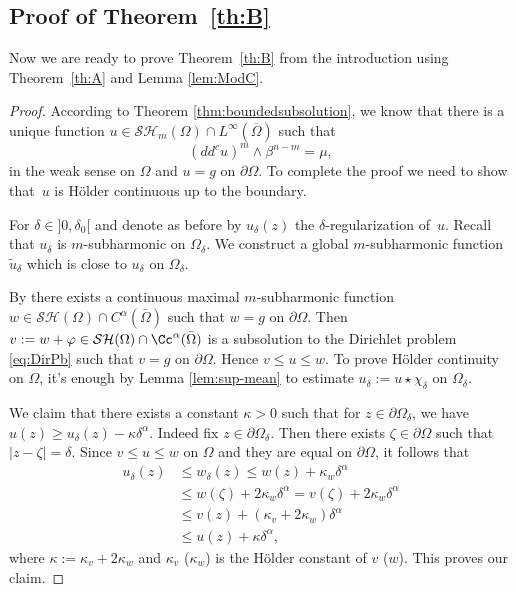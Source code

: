 \subsection{Proof of Theorem~\ref{th:B}}

Now we are ready to prove Theorem~\ref{th:B} from the introduction using Theorem~\ref{th:A} and Lemma \ref{lem:ModC}.

\begin{proof} According to Theorem \ref{thm:boundedsubsolution}, we know that there is a unique function $u\in \mathcal{SH}_m(\Omega)\cap L^{\infty}(\overline{\Omega}) $ such that
\[
(dd^c u)^m\wedge\beta^{n-m}=\mu,
\]
in the weak sense on $\Omega$ and $ u=g $ on $\partial\Omega$. To complete the proof we need to show that~$u$ is Hölder continuous up to the boundary.

For $\delta\in{}]0,\delta_0[$ and denote as before by $u_{\delta}(z)$ the $\delta$-regularization of~$u$. Recall that ${u}_{\delta}$ is $m$-subharmonic on $\Omega_\delta$. We construct a global $m$-subharmonic function $\tilde{u}_{\delta}$ which is close to ${u}_{\delta}$ on $\Omega_\delta$.

By \cite{Ch16} there exists a continuous maximal $m$-subharmonic function $w \in \mathcal{SH} (\Omega) \cap C^{\alpha} (\bar \Omega)$ such that $w = g$ on $\partial \Omega$. Then $v: = w + \varphi \in \mathcal{SH} (\Omega) \cap \Cc^{\alpha} (\bar \Omega)$ is a subsolution to the Dirichlet problem \eqref{eq:DirPb} such that $v = g$ on $\partial \Omega$. Hence $v \leq u \leq w$. To prove Hölder continuity on $\Omega$, it's enough by Lemma \ref{lem:sup-mean} to estimate $u_\delta:= u \star \chi_\delta$
on $\Omega_\delta$.

We claim that there exists a constant $\kappa > 0$ such that for $z\in\partial\Omega_{\delta}$, we have $ u (z) \geq {u}_{\delta}(z) - \kappa \delta^{\alpha} $. Indeed fix $z\in\partial\Omega_{\delta}$. Then there exists $\zeta \in \partial \Omega$ such that $\vert z -\zeta \vert = \delta$. Since $v \leq u \leq w$ on $\Omega$ and they are equal on $\partial \Omega$, it follows that
\begin{align*}
u_{\delta} (z) & \leq w_\delta (z) \leq w (z) + \kappa_w \delta^\alpha \\
& \leq w (\zeta) + 2 \kappa_w \delta^\alpha = v (\zeta) + 2 \kappa_w \delta^\alpha \\
& \leq v (z) +( \kappa_v + 2 \kappa_w) \delta^\alpha \\
& \leq u (z) + \kappa \delta^\alpha,
\end{align*}
where $\kappa:= \kappa_v + 2 \kappa_w$ and $ \kappa_v$ (\resp $\kappa_w$) is the Hölder constant of $v$ (\resp $w$). This proves our claim.


\end{proof}
